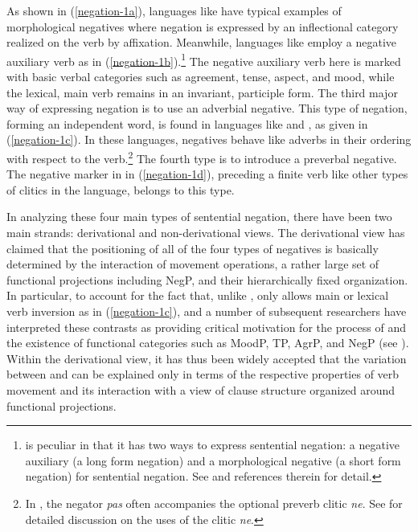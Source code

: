 \documentclass[output=paper
 	        ,biblatex
                ,babelshorthands
                ,newtxmath
                ,draftmode
                ,colorlinks, citecolor=brown
]{langscibook}
\begin{document}
\noindent
As shown in (\ref{negation-1a}), languages like 
have typical examples of morphological negatives where
negation is expressed by an inflectional category realized on the
verb by affixation. Meanwhile, languages like 
 employ a negative auxiliary verb as in (\ref{negation-1b}).\footnote{
 is peculiar in that it has two ways to
 express sentential negation: a negative auxiliary (a long form
 negation)  and a morphological negative (a short form negation)
 for sentential negation. See \citet{Kim:00,Kim:16} and references therein for detail.}
  The negative auxiliary
 verb here is marked with basic verbal categories such as agreement, tense, aspect, and mood, while the lexical, main verb remains in an invariant, participle form. The third major way of expressing negation is to use an adverbial
negative. This type of negation, forming an independent word, is found in
languages like  and , as given in (\ref{negation-1c}). In these languages, negatives behave like adverbs in their ordering with respect to the verb.\footnote{In , the negator \emph{pas}
often accompanies the optional preverb clitic \emph{ne}. See \citet{Godard:2004} for detailed discussion on the uses of the clitic \emph{ne}.} The fourth
type is to introduce a preverbal negative. The negative marker in  in (\ref{negation-1d}), preceding a finite verb like other types of clitics in the language,
belongs to this type.


In analyzing these four main types of sentential negation, there have been two main strands: derivational and non-derivational views. The derivational view has claimed that the positioning of all of the
four types of negatives is basically determined by the interaction of movement
operations, a rather large set of functional projections including NegP,
and their hierarchically fixed organization.
In particular, to account for the
fact that, unlike , only  allows main or lexical verb inversion
as in (\ref{negation-1c}), \citet{Pollock:89,Pollock:94} and a number of subsequent researchers
have interpreted these contrasts as providing critical motivation for
the process of  and the existence of functional
categories such as MoodP, TP, AgrP, and NegP (see \citealt{Belletti:90, Zanuttini:97,Chomsky:91,Chomsky:93,Lasnik:95, Haegeman:95,Haegeman:97, Vikner97a-u, Zanuttini:2001, Zeijlstra:15}).
Within the derivational view, it has thus been widely
accepted that the variation between  and  can be explained only in terms of the respective properties of verb movement and its interaction with a view of clause
structure organized around functional projections.
\end{document}
